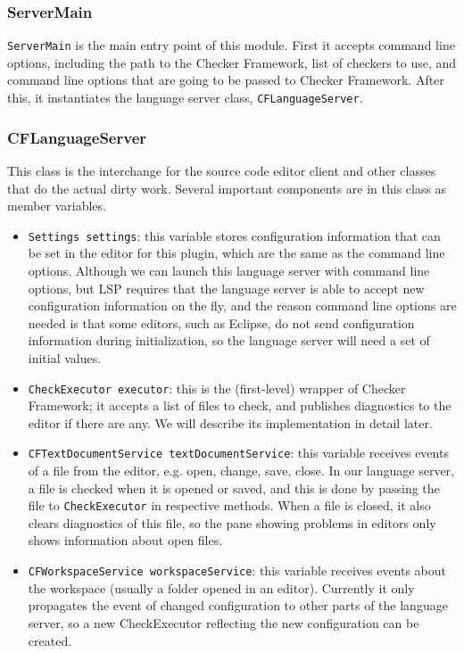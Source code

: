 \documentclass{article}
\begin{document}
\subsubsection{ServerMain}

\verb|ServerMain| is the main entry point of this module. First it accepts command line options, including the path to the Checker Framework, list of checkers to use, and command line options that are going to be passed to Checker Framework. After this, it instantiates the language server class, \verb|CFLanguageServer|.

\subsubsection{CFLanguageServer}

This class is the interchange for the source code editor client and other classes that do the actual dirty work. Several important components are in this class as member variables.

\begin{itemize}
    \item \verb|Settings settings|: this variable stores configuration information that can be set in the editor for this plugin, which are the same as the command line options. Although we can launch this language server with command line options, but LSP requires that the language server is able to accept new configuration information on the fly, and the reason command line options are needed is that some editors, such as Eclipse, do not send configuration information during initialization, so the language server will need a set of initial values.
    \item \verb|CheckExecutor executor|: this is the (first-level) wrapper of Checker Framework; it accepts a list of files to check, and publishes diagnostics to the editor if there are any. We will describe its implementation in detail later.
    \item \verb|CFTextDocumentService textDocumentService|: this variable receives events of a file from the editor, e.g. open, change, save, close. In our language server, a file is checked when it is opened or saved, and this is done by passing the file to \verb|CheckExecutor| in respective methods. When a file is closed, it also clears diagnostics of this file, so the pane showing problems in editors only shows information about open files.
    \item \verb|CFWorkspaceService workspaceService|: this variable receives events about the workspace (usually a folder opened in an editor). Currently it only propagates the event of changed configuration to other parts of the language server, so a new CheckExecutor reflecting the new configuration can be created.
\end{itemize}
\end{document}
